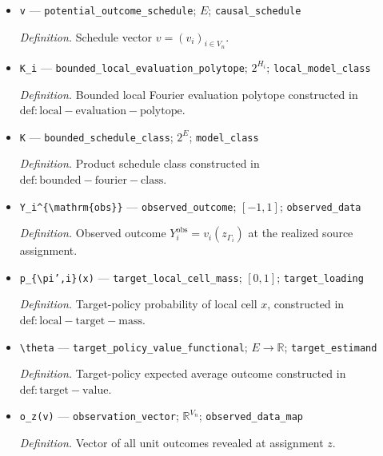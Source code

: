 \documentclass{article}
\begin{document}
\begin{itemize}
  \item \texttt{v} --- \texttt{potential\_\allowbreak{}outcome\_\allowbreak{}schedule}; \(E\); \texttt{causal\_\allowbreak{}schedule}
  \par\smallskip\noindent\emph{Definition.} Schedule vector \(v=(v_i)_{i\in V_n}\).
  \item \texttt{K\_\allowbreak{}i} --- \texttt{bounded\_\allowbreak{}local\_\allowbreak{}evaluation\_\allowbreak{}polytope}; \(2^{H_i}\); \texttt{local\_\allowbreak{}model\_\allowbreak{}class}
  \par\smallskip\noindent\emph{Definition.} Bounded local Fourier evaluation polytope constructed in \(\mathrm{def:local-evaluation-polytope}\).
  \item \texttt{K} --- \texttt{bounded\_\allowbreak{}schedule\_\allowbreak{}class}; \(2^E\); \texttt{model\_\allowbreak{}class}
  \par\smallskip\noindent\emph{Definition.} Product schedule class constructed in \(\mathrm{def:bounded-fourier-class}\).
  \item \texttt{Y\_\allowbreak{}i\textasciicircum{}\{\textbackslash{}\allowbreak{}mathrm\{obs\}\allowbreak{}\}\allowbreak{}} --- \texttt{observed\_\allowbreak{}outcome}; \([-1,1]\); \texttt{observed\_\allowbreak{}data}
  \par\smallskip\noindent\emph{Definition.} Observed outcome \(Y_i^{\mathrm{obs}}=v_i(z_{\Gamma_i})\) at the realized source assignment.
  \item \texttt{p\_\allowbreak{}\{\textbackslash{}\allowbreak{}pi',\allowbreak{}i\}\allowbreak{}(x)} --- \texttt{target\_\allowbreak{}local\_\allowbreak{}cell\_\allowbreak{}mass}; \([0,1]\); \texttt{target\_\allowbreak{}loading}
  \par\smallskip\noindent\emph{Definition.} Target-policy probability of local cell \(x\), constructed in \(\mathrm{def:local-target-mass}\).
  \item \texttt{\textbackslash{}\allowbreak{}theta} --- \texttt{target\_\allowbreak{}policy\_\allowbreak{}value\_\allowbreak{}functional}; \(E\to\mathbb R\); \texttt{target\_\allowbreak{}estimand}
  \par\smallskip\noindent\emph{Definition.} Target-policy expected average outcome constructed in \(\mathrm{def:target-value}\).
  \item \texttt{o\_\allowbreak{}z(v)} --- \texttt{observation\_\allowbreak{}vector}; \(\mathbb R^{V_n}\); \texttt{observed\_\allowbreak{}data\_\allowbreak{}map}
  \par\smallskip\noindent\emph{Definition.} Vector of all unit outcomes revealed at assignment \(z\).

\end{itemize}
\end{document}
